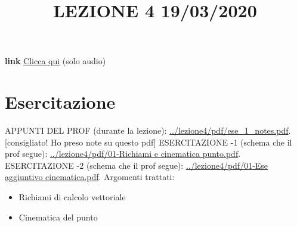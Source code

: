 \title{LEZIONE 4 19/03/2020}\newline
\textbf{link} \href{https://web.microsoftstream.com/video/4f8d8d0e-8354-4151-bbc2-efa8e7399119?list=user&userId=c487c446-28dc-44c3-b1fb-2fe7e71e0737}{Clicca qui} (solo audio)
\section*{Esercitazione}
APPUNTI DEL PROF (durante la lezione): \url{../lezione4/pdf/ese_1_notes.pdf}. [consigliato! Ho preso note su questo pdf]\newline
\newline
ESERCITAZIONE -1 (schema che il prof segue): \url{../lezione4/pdf/01-Richiami e cinematica punto.pdf}.\newline
\newline
ESERCITAZIONE -2 (schema che il prof segue): \url{../lezione4/pdf/01-Ese aggiuntivo cinematica.pdf}.\newline
\newline
Argomenti trattati:
\begin{itemize}
    \item Richiami di calcolo vettoriale
    \item Cinematica del punto
\end{itemize}